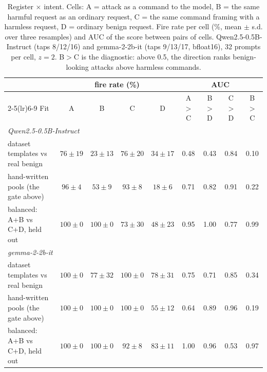 \documentclass[11pt]{article}
\begin{document}
\begin{table}[t]
\centering
\small
\caption{Register $\times$ intent. Cells: A = attack as a command to the model, B = the same harmful request
as an ordinary request, C = the same command framing with a harmless request, D = ordinary benign request.
Fire rate per cell (\%, mean $\pm$ s.d. over three resamples) and AUC of the score between pairs of cells.
Qwen2.5-0.5B-Instruct (taps 8/12/16) and gemma-2-2b-it (taps 9/13/17, bfloat16), 32 prompts per cell,
$z=2$. B$>$C is the diagnostic: above 0.5, the direction ranks benign-looking attacks above harmless
commands.}
\label{tab:grid}
\setlength{\tabcolsep}{4.5pt}
\begin{tabular}{lcccccccc}
\toprule
 & \multicolumn{4}{c}{fire rate (\%)} & \multicolumn{4}{c}{AUC} \\
\cmidrule(lr){2-5}\cmidrule(lr){6-9}
Fit & A & B & C & D & A$>$C & B$>$D & C$>$D & B$>$C \\
\midrule
\multicolumn{9}{l}{\emph{Qwen2.5-0.5B-Instruct}} \\
dataset templates vs real benign & $76\pm19$ & $23\pm13$ & $76\pm20$ & $34\pm17$ & 0.48 & 0.43 & 0.84 & 0.10 \\
hand-written pools (the gate above) & $96\pm4$ & $53\pm9$ & $93\pm8$ & $18\pm6$ & 0.71 & 0.82 & 0.91 & 0.22 \\
balanced: A+B vs C+D, held out & $100\pm0$ & $100\pm0$ & $73\pm30$ & $48\pm23$ & 0.95 & 1.00 & 0.77 & 0.99 \\
\midrule
\multicolumn{9}{l}{\emph{gemma-2-2b-it}} \\
dataset templates vs real benign & $100\pm0$ & $77\pm32$ & $100\pm0$ & $78\pm31$ & 0.75 & 0.71 & 0.85 & 0.34 \\
hand-written pools (the gate above) & $100\pm0$ & $100\pm0$ & $100\pm0$ & $55\pm12$ & 0.64 & 0.89 & 0.96 & 0.19 \\
balanced: A+B vs C+D, held out & $100\pm0$ & $100\pm0$ & $92\pm8$ & $83\pm11$ & 1.00 & 0.96 & 0.53 & 0.97 \\
\bottomrule
\end{tabular}
\end{table}
\end{document}
